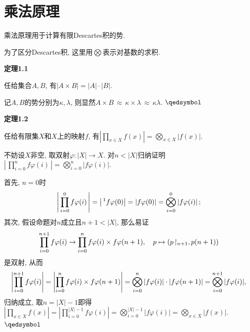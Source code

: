 \documentclass[UTF8]{ctexart}
\begin{document}
\setlength{\abovedisplayskip}{1pt}
\setlength{\belowdisplayskip}{1pt}

\section{乘法原理}

乘法原理用于计算有限Descartes积的势.

为了区分Descartes积, 这里用$\displaystyle\bigotimes$表示对基数的求积.

\vspace{10pt}

\hypertarget{sec:定理1.1}{}
\noindent\textbf{定理1.1}

任给集合$A,B$, 有$|A\times B|=|A|\cdot|B|$.


记$A,B$的势分别为$\kappa,\lambda$, 则显然$A\times B\,\approx\,
\kappa\times\lambda\,\approx\,\kappa\lambda$. \hfill $\qedsymbol$

\vspace{10pt}

\hypertarget{sec:定理1.2}{}
\noindent\textbf{定理1.2}

任给有限集$X$和$X$上的映射$f$, 有$\displaystyle
\left|\prod_{x\in X}f(x)\right|=\bigotimes_{x\in X}|f(x)|$.


不妨设$X$非空, 取双射$\varphi:|X|\to X$. 对$n<|X|$归纳证明$\displaystyle
\left|\,\prod_{i=0}^nf\varphi(i)\,\right|=\bigotimes_{i=0}^n|f\varphi(i)|$.

首先, $n=0$时
\[
    \left|\,\prod_{i=0}^0f\varphi(i)\,\right|=\left|\,^1f\varphi(0)\right|=
    |f\varphi(0)|=\bigotimes_{i=0}^0|f\varphi(i)|\,;\\[3pt]
\]
其次, 假设命题对$n$成立且$n+1<|X|$, 那么易证
\vspace{3pt}
\[
    \prod_{i=0}^{n+1}f\varphi(i)\to\prod_{i=0}^nf\varphi(i)\times f\varphi(n+1),
    \quad p\mapsto(p\!\restriction_{n+1},p(n+1))\\[3pt]
\]
是双射, 从而
\vspace{3pt}
\[
    \left|\prod_{i=0}^{n+1}f\varphi(i)\right|=
    \left|\prod_{i=0}^nf\varphi(i)\times f\varphi(n+1)\right|=
    \bigotimes_{i=0}^n|f\varphi(i)|\cdot|f\varphi(n+1)|=
    \bigotimes_{i=0}^{n+1}|f\varphi(i)|,\\[6pt]
\]
归纳成立, 取$n=|X|-1$即得$\displaystyle\left|\prod_{x\in X}f(x)\right|=
\left|\prod_{i=0}^{|X|-1}f\varphi(i)\right|=
\bigotimes_{i=0}^{|X|-1}|f\varphi(i)|=\bigotimes_{x\in X}|f(x)|$.
\hfill $\qedsymbol$
\end{document}
